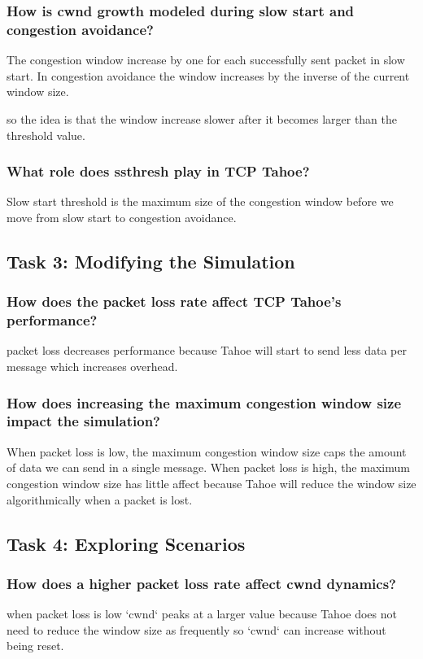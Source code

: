 \documentclass{article}
\begin{document}
\subsubsection{How is cwnd growth modeled during slow start and congestion avoidance?}
The congestion window increase by one for each successfully sent packet in slow start. 
In congestion avoidance the window increases by the inverse of the current window size. 

so the idea is that the window increase slower after it becomes larger than the threshold value.

\subsubsection{What role does ssthresh play in TCP Tahoe?}
Slow start threshold is the maximum size of the congestion window before we move from slow start to congestion avoidance.


\subsection{Task 3: Modifying the Simulation}

\subsubsection{How does the packet loss rate affect TCP Tahoe’s performance?}
packet loss decreases performance because Tahoe will start to send less data per message which increases overhead.

\subsubsection{How does increasing the maximum congestion window size impact the simulation?}
When packet loss is low, the maximum congestion window size caps the amount of data we can send in a single message.
When packet loss is high, the maximum congestion window size has little affect because Tahoe will reduce the window size algorithmically when a packet is lost.


\subsection{Task 4: Exploring Scenarios}

\subsubsection{How does a higher packet loss rate affect cwnd dynamics?}
when packet loss is low `cwnd` peaks at a larger value because Tahoe does not need to reduce the window size as frequently so `cwnd` can increase without being reset.
\end{document}
